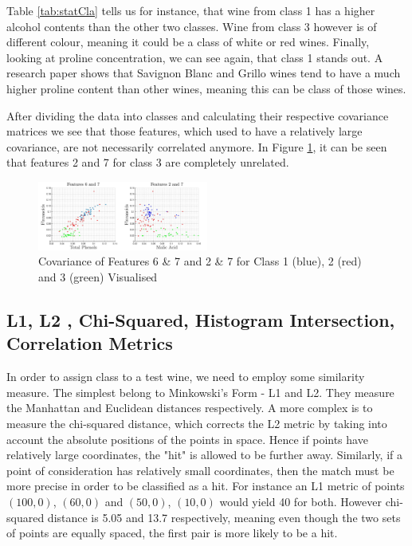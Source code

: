 \documentclass[10pt,twocolumn,letterpaper]{article}
\begin{document}
Table \ref{tab:statCla} tells us for instance, that wine from class 1 has a higher alcohol contents than the other two classes. Wine from class 3 however is of different colour, meaning it could be a class of white or red wines. Finally, looking at proline concentration, we can see again, that class 1 stands out. A research paper \cite{wine} shows that Savignon Blanc and Grillo wines tend to have a much higher proline content than other wines, meaning this can be class of those wines.

 
After dividing the data into classes and calculating their respective covariance matrices we see that those features, which used to have a relatively large covariance, are not necessarily correlated anymore. In Figure \ref{fig:covIdv}, it can be seen that features 2 and 7 for class 3 are completely unrelated.

\begin{figure}[H]
\centering
\includegraphics[width=0.5\textwidth]{../results/Q1_covIdv}
\caption{Covariance of Features 6 \& 7 and 2 \& 7  for Class 1 (blue), 2 (red) and 3 (green) Visualised \label{fig:covIdv}}
\end{figure}

\subsection{L1, L2 , Chi-Squared, Histogram Intersection, Correlation Metrics}

In order to assign class to a test wine, we need to employ some similarity measure. The simplest belong to Minkowski's Form - L1 and L2. They measure the Manhattan and Euclidean distances respectively. A more complex is to measure the chi-squared distance, which corrects the L2 metric by taking into account the absolute positions of the points in space. Hence if points have relatively large coordinates, the "hit" is allowed to be further away. Similarly, if a point of consideration has relatively small coordinates, then the match must be more precise in order to be classified as a hit. For instance an L1 metric of points $(100,0)$, $(60,0)$ and $(50,0)$, $(10,0)$ would yield 40 for both. However chi-squared distance is 5.05 and 13.7 respectively, meaning even though the two sets of points are equally spaced, the first pair is more likely to be a hit.
\end{document}
